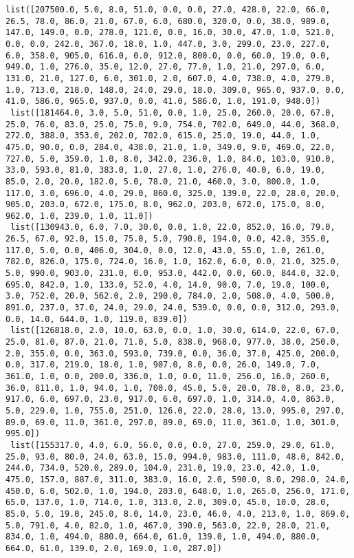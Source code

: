 \documentclass[11pt]{article}
\begin{document}
\begin{Verbatim}[commandchars=\\\{\}]
 list([207500.0, 5.0, 8.0, 51.0, 0.0, 0.0, 27.0, 428.0, 22.0, 66.0, 26.5, 78.0, 86.0, 21.0, 67.0, 6.0, 680.0, 320.0, 0.0, 38.0, 989.0, 147.0, 149.0, 0.0, 278.0, 121.0, 0.0, 16.0, 30.0, 47.0, 1.0, 521.0, 0.0, 0.0, 242.0, 367.0, 18.0, 1.0, 447.0, 3.0, 299.0, 23.0, 227.0, 6.0, 358.0, 905.0, 616.0, 0.0, 912.0, 800.0, 0.0, 60.0, 19.0, 0.0, 949.0, 1.0, 276.0, 35.0, 12.0, 27.0, 77.0, 1.0, 21.0, 297.0, 6.0, 131.0, 21.0, 127.0, 6.0, 301.0, 2.0, 607.0, 4.0, 738.0, 4.0, 279.0, 1.0, 713.0, 218.0, 148.0, 24.0, 29.0, 18.0, 309.0, 965.0, 937.0, 0.0, 41.0, 586.0, 965.0, 937.0, 0.0, 41.0, 586.0, 1.0, 191.0, 948.0])
 list([181464.0, 3.0, 5.0, 51.0, 0.0, 1.0, 25.0, 260.0, 20.0, 67.0, 25.0, 76.0, 83.0, 25.0, 75.0, 9.0, 754.0, 702.0, 649.0, 44.0, 368.0, 272.0, 388.0, 353.0, 202.0, 702.0, 615.0, 25.0, 19.0, 44.0, 1.0, 475.0, 90.0, 0.0, 284.0, 438.0, 21.0, 1.0, 349.0, 9.0, 469.0, 22.0, 727.0, 5.0, 359.0, 1.0, 8.0, 342.0, 236.0, 1.0, 84.0, 103.0, 910.0, 33.0, 593.0, 81.0, 383.0, 1.0, 27.0, 1.0, 276.0, 40.0, 6.0, 19.0, 85.0, 2.0, 20.0, 182.0, 5.0, 78.0, 21.0, 460.0, 3.0, 800.0, 1.0, 117.0, 3.0, 696.0, 4.0, 29.0, 860.0, 325.0, 139.0, 22.0, 28.0, 20.0, 905.0, 203.0, 672.0, 175.0, 8.0, 962.0, 203.0, 672.0, 175.0, 8.0, 962.0, 1.0, 239.0, 1.0, 11.0])
 list([130943.0, 6.0, 7.0, 30.0, 0.0, 1.0, 22.0, 852.0, 16.0, 79.0, 26.5, 67.0, 92.0, 15.0, 75.0, 5.0, 790.0, 194.0, 0.0, 42.0, 355.0, 117.0, 5.0, 0.0, 406.0, 304.0, 0.0, 12.0, 43.0, 55.0, 1.0, 261.0, 782.0, 826.0, 175.0, 724.0, 16.0, 1.0, 162.0, 6.0, 0.0, 21.0, 325.0, 5.0, 990.0, 903.0, 231.0, 0.0, 953.0, 442.0, 0.0, 60.0, 844.0, 32.0, 695.0, 842.0, 1.0, 133.0, 52.0, 4.0, 14.0, 90.0, 7.0, 19.0, 100.0, 3.0, 752.0, 20.0, 562.0, 2.0, 290.0, 784.0, 2.0, 508.0, 4.0, 500.0, 891.0, 237.0, 37.0, 24.0, 29.0, 24.0, 539.0, 0.0, 0.0, 312.0, 293.0, 0.0, 14.0, 644.0, 1.0, 119.0, 839.0])
 list([126818.0, 2.0, 10.0, 63.0, 0.0, 1.0, 30.0, 614.0, 22.0, 67.0, 25.0, 81.0, 87.0, 21.0, 71.0, 5.0, 838.0, 968.0, 977.0, 38.0, 250.0, 2.0, 355.0, 0.0, 363.0, 593.0, 739.0, 0.0, 36.0, 37.0, 425.0, 200.0, 0.0, 317.0, 219.0, 18.0, 1.0, 907.0, 8.0, 0.0, 26.0, 149.0, 7.0, 361.0, 1.0, 0.0, 200.0, 336.0, 1.0, 0.0, 11.0, 256.0, 16.0, 260.0, 36.0, 811.0, 1.0, 94.0, 1.0, 700.0, 45.0, 5.0, 20.0, 78.0, 8.0, 23.0, 917.0, 6.0, 697.0, 23.0, 917.0, 6.0, 697.0, 1.0, 314.0, 4.0, 863.0, 5.0, 229.0, 1.0, 755.0, 251.0, 126.0, 22.0, 28.0, 13.0, 995.0, 297.0, 89.0, 69.0, 11.0, 361.0, 297.0, 89.0, 69.0, 11.0, 361.0, 1.0, 301.0, 995.0])
 list([155317.0, 4.0, 6.0, 56.0, 0.0, 0.0, 27.0, 259.0, 29.0, 61.0, 25.0, 93.0, 80.0, 24.0, 63.0, 15.0, 994.0, 983.0, 111.0, 48.0, 842.0, 244.0, 734.0, 520.0, 289.0, 104.0, 231.0, 19.0, 23.0, 42.0, 1.0, 475.0, 157.0, 887.0, 311.0, 383.0, 16.0, 2.0, 590.0, 8.0, 298.0, 24.0, 450.0, 6.0, 502.0, 1.0, 194.0, 203.0, 648.0, 1.0, 265.0, 256.0, 171.0, 65.0, 137.0, 1.0, 714.0, 1.0, 313.0, 2.0, 309.0, 45.0, 10.0, 28.0, 85.0, 5.0, 19.0, 245.0, 8.0, 14.0, 23.0, 46.0, 4.0, 213.0, 1.0, 869.0, 5.0, 791.0, 4.0, 82.0, 1.0, 467.0, 390.0, 563.0, 22.0, 28.0, 21.0, 834.0, 1.0, 494.0, 880.0, 664.0, 61.0, 139.0, 1.0, 494.0, 880.0, 664.0, 61.0, 139.0, 2.0, 169.0, 1.0, 287.0])

\end{Verbatim}
\end{document}
